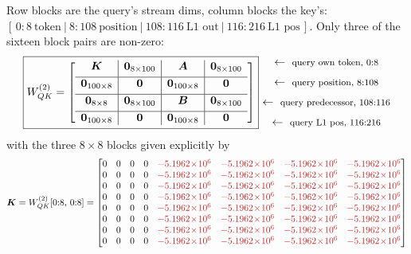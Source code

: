 \documentclass[11pt]{article}
\newcommand{\Wqk}{W_{QK}}
\newcommand{\rowlab}[1]{\ \leftarrow\ \text{\footnotesize #1}}
\begin{document}
Row blocks are the query's stream dims, column blocks the key's:
$[\,0{:}8\ \text{token}\ |\ 8{:}108\ \text{position}\ |\ 108{:}116\ \text{L1 out}\ |\
116{:}216\ \text{L1 pos}\,]$. Only three of the sixteen block pairs are non-zero:
\begin{equation}
\boxed{
\Wqk^{(2)}=
\left[
\begin{array}{c|c|c|c}
\bm{K} & \bm{0}_{8\times100} & \bm{A} & \bm{0}_{8\times100}\\[3pt]
\hline
\bm{0}_{100\times8} & \bm{0} & \bm{0}_{100\times8} & \bm{0}\\[3pt]
\hline
\bm{0}_{8\times8} & \bm{0}_{8\times100} & \bm{B} & \bm{0}_{8\times100}\\[3pt]
\hline
\bm{0}_{100\times8} & \bm{0} & \bm{0}_{100\times8} & \bm{0}
\end{array}
\right]}
\begin{matrix}
\rowlab{query own token, $0{:}8$}\\[6pt]
\rowlab{query position, $8{:}108$}\\[6pt]
\rowlab{query predecessor, $108{:}116$}\\[6pt]
\rowlab{query L1 pos, $116{:}216$}
\end{matrix}
\end{equation}
with the three $8\times8$ blocks given explicitly by
\begin{equation}
\bm{K}=\Wqk^{(2)}[0{:}8,\,0{:}8]=
\begin{bmatrix}
0&0&0&0&\textcolor{hl}{-5.1962\!\times\!10^{6}}&\textcolor{hl}{-5.1962\!\times\!10^{6}}&\textcolor{hl}{-5.1962\!\times\!10^{6}}&\textcolor{hl}{-5.1962\!\times\!10^{6}}\\
0&0&0&0&\textcolor{hl}{-5.1962\!\times\!10^{6}}&\textcolor{hl}{-5.1962\!\times\!10^{6}}&\textcolor{hl}{-5.1962\!\times\!10^{6}}&\textcolor{hl}{-5.1962\!\times\!10^{6}}\\
0&0&0&0&\textcolor{hl}{-5.1962\!\times\!10^{6}}&\textcolor{hl}{-5.1962\!\times\!10^{6}}&\textcolor{hl}{-5.1962\!\times\!10^{6}}&\textcolor{hl}{-5.1962\!\times\!10^{6}}\\
0&0&0&0&\textcolor{hl}{-5.1962\!\times\!10^{6}}&\textcolor{hl}{-5.1962\!\times\!10^{6}}&\textcolor{hl}{-5.1962\!\times\!10^{6}}&\textcolor{hl}{-5.1962\!\times\!10^{6}}\\
0&0&0&0&\textcolor{hl}{-5.1962\!\times\!10^{6}}&\textcolor{hl}{-5.1962\!\times\!10^{6}}&\textcolor{hl}{-5.1962\!\times\!10^{6}}&\textcolor{hl}{-5.1962\!\times\!10^{6}}\\
0&0&0&0&\textcolor{hl}{-5.1962\!\times\!10^{6}}&\textcolor{hl}{-5.1962\!\times\!10^{6}}&\textcolor{hl}{-5.1962\!\times\!10^{6}}&\textcolor{hl}{-5.1962\!\times\!10^{6}}\\
0&0&0&0&\textcolor{hl}{-5.1962\!\times\!10^{6}}&\textcolor{hl}{-5.1962\!\times\!10^{6}}&\textcolor{hl}{-5.1962\!\times\!10^{6}}&\textcolor{hl}{-5.1962\!\times\!10^{6}}\\
0&0&0&0&\textcolor{hl}{-5.1962\!\times\!10^{6}}&\textcolor{hl}{-5.1962\!\times\!10^{6}}&\textcolor{hl}{-5.1962\!\times\!10^{6}}&\textcolor{hl}{-5.1962\!\times\!10^{6}}
\end{bmatrix}
\end{equation}
\end{document}

